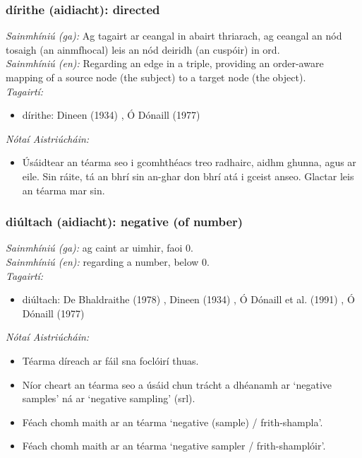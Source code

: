 \documentclass{article}
\begin{document}
\subsubsection*{dírithe (aidiacht): directed}
 \noindent \textit{Sainmhíniú (ga):} Ag tagairt ar ceangal in abairt thriarach, ag ceangal an nód tosaigh (an ainmfhocal) leis an nód deiridh (an cuspóir) in ord.
\\
 \noindent \textit{Sainmhíniú (en):} Regarding an edge in a triple, providing an order-aware mapping of a source node (the subject) to a target node (the object).
\\
 \noindent \textit{Tagairtí:}
\begin{itemize}
	\item dírithe: Dineen (1934) \cite{dineen}, Ó Dónaill (1977) \cite{odonaill}
\end{itemize}

 \noindent \textit{Nótaí Aistriúcháin:}
\begin{itemize}
	\item Úsáidtear an téarma seo i gcomhthéacs treo radhairc, aidhm ghunna, agus ar eile. Sin ráite, tá an bhrí sin an-ghar don bhrí atá i gceist anseo. Glactar leis an téarma mar sin.
\end{itemize}


\subsubsection*{diúltach (aidiacht): negative (of number)}
 \noindent \textit{Sainmhíniú (ga):} ag caint ar uimhir, faoi 0.
\\
 \noindent \textit{Sainmhíniú (en):} regarding a number, below 0.
\\
 \noindent \textit{Tagairtí:}
\begin{itemize}
	\item diúltach: De Bhaldraithe (1978) \cite{de-bhaldraithe}, Dineen (1934) \cite{dineen}, Ó Dónaill et al. (1991) \cite{focloir-beag}, Ó Dónaill (1977) \cite{odonaill}
\end{itemize}

 \noindent \textit{Nótaí Aistriúcháin:}
\begin{itemize}
	\item Téarma díreach ar fáil sna foclóirí thuas.
	\item Níor cheart an téarma seo a úsáid chun trácht a dhéanamh ar `negative samples' ná ar `negative sampling' (srl).
	\item Féach chomh maith ar an téarma `negative (sample) / frith-shampla'.
	\item Féach chomh maith ar an téarma `negative sampler / frith-shamplóir'.
\end{itemize}
\end{document}
